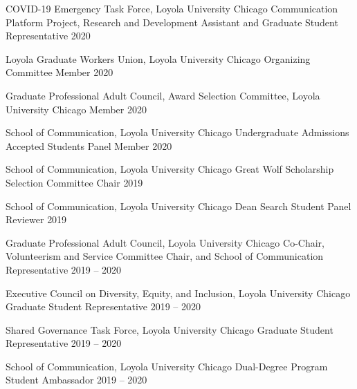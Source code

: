\begin{cvhonors}
  \cvhonor
    {COVID-19 Emergency Task Force, Loyola University Chicago } %
    {Communication Platform Project, Research and Development Assistant and Graduate Student Representative } %
    {} %
    {2020} %

  \cvhonor
    {Loyola Graduate Workers Union, Loyola University Chicago} %
    {Organizing Committee Member } %
    {} %
    {2020} %

  \cvhonor
    {Graduate Professional Adult Council, Award Selection Committee, Loyola University Chicago} %
    {Member } %
    {} %
    {2020} %

   \cvhonor
   {School of Communication, Loyola University Chicago} %
    {Undergraduate Admissions Accepted Students Panel Member} %
    {} %
    {2020} %
    
\cvhonor
   {School of Communication, Loyola University Chicago} %
    {Great Wolf Scholarship Selection Committee Chair} %
    {} %
    {2019} %
    
    \cvhonor
   {School of Communication, Loyola University Chicago} %
    {Dean Search Student Panel Reviewer} %
    {} %
    {2019} %
    
\cvhonor
   {Graduate Professional Adult Council, Loyola University Chicago} %
    {Co-Chair, Volunteerism and Service Committee Chair, and School of Communication Representative } %
    {} %
    {2019 -- 2020} %
    
        \cvhonor
   {Executive Council on Diversity, Equity, and Inclusion, Loyola University Chicago} %
    {Graduate Student Representative} %
    {} %
    {2019 -- 2020} %
    
      \cvhonor
   {Shared Governance Task Force, Loyola University Chicago} %
    {Graduate Student Representative} %
    {} %
    {2019 -- 2020} %
    
          \cvhonor
   {School of Communication, Loyola University Chicago} %
    {Dual-Degree Program Student Ambassador} %
    {} %
    {2019 -- 2020} %
\end{cvhonors}

